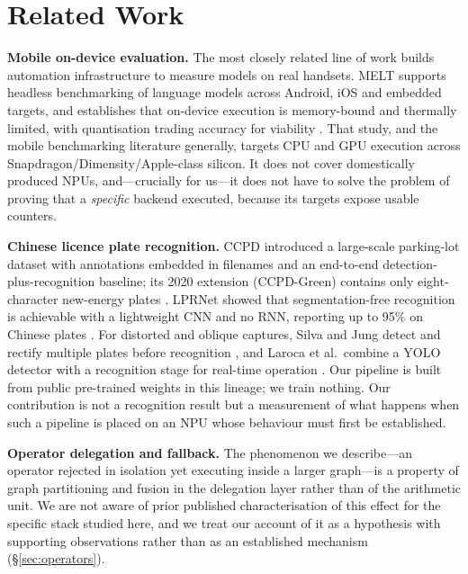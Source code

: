 \documentclass[conference]{IEEEtran}
\begin{document}
\section{Related Work}

\textbf{Mobile on-device evaluation.} The most closely related line of work
builds automation infrastructure to measure models on real handsets. MELT
supports headless benchmarking of language models across Android, iOS and
embedded targets, and establishes that on-device execution is
memory-bound and thermally limited, with quantisation trading accuracy for
viability \cite{laskaridis2024melt}. That study, and the mobile benchmarking
literature generally, targets CPU and GPU execution across
Snapdragon/Dimensity/Apple-class silicon. It does not cover domestically
produced NPUs, and---crucially for us---it does not have to solve the problem of
proving that a \emph{specific} backend executed, because its targets expose
usable counters.

\textbf{Chinese licence plate recognition.} CCPD introduced a large-scale
parking-lot dataset with annotations embedded in filenames and an end-to-end
detection-plus-recognition baseline; its 2020 extension (CCPD-Green) contains
only eight-character new-energy plates \cite{xu2018ccpd}. LPRNet showed that
segmentation-free recognition is achievable with a lightweight CNN and no RNN,
reporting up to 95\% on Chinese plates \cite{zherzdev2018lprnet}. For distorted
and oblique captures, Silva and Jung detect and rectify multiple plates before
recognition \cite{silva2018unconstrained}, and Laroca et al.\ combine a YOLO
detector with a recognition stage for real-time operation \cite{laroca2018robust}.
Our pipeline is built from public pre-trained weights in this lineage; we train
nothing. Our contribution is not a recognition result but a measurement of what
happens when such a pipeline is placed on an NPU whose behaviour must first be
established.

\textbf{Operator delegation and fallback.} The phenomenon we describe---an
operator rejected in isolation yet executing inside a larger graph---is a
property of graph partitioning and fusion in the delegation layer rather than of
the arithmetic unit. We are not aware of prior published characterisation of
this effect for the specific stack studied here, and we treat our account of it
as a hypothesis with supporting observations rather than as an established
mechanism (\S\ref{sec:operators}).
\end{document}
